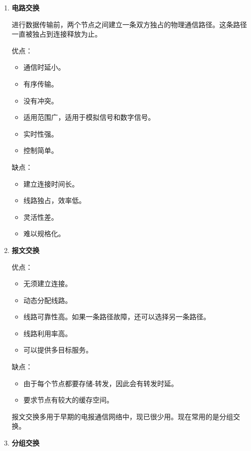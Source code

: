 \documentclass[12pt, a4paper, oneside]{ctexart}
\begin{document}
\begin{enumerate}
    \item {\bf 电路交换}
    
    进行数据传输前，两个节点之间建立一条双方独占的物理通信路径。这条路径一直被独占到连接释放为止。

    优点：
    \begin{itemize}
        \item 通信时延小。
        \item 有序传输。
        \item 没有冲突。
        \item 适用范围广，适用于模拟信号和数字信号。
        \item 实时性强。
        \item 控制简单。
    \end{itemize}
    缺点：
    \begin{itemize}
        \item 建立连接时间长。
        \item 线路独占，效率低。
        \item 灵活性差。
        \item 难以规格化。
    \end{itemize}
    \item {\bf 报文交换}
    
    优点：
    \begin{itemize}
        \item 无须建立连接。
        \item 动态分配线路。
        \item 线路可靠性高。如果一条路径故障，还可以选择另一条路径。
        \item 线路利用率高。
        \item 可以提供多目标服务。
    \end{itemize}
    缺点：
    \begin{itemize}
        \item 由于每个节点都要存储-转发，因此会有转发时延。
        \item 要求节点有较大的缓存空间。
    \end{itemize}
    报文交换多用于早期的电报通信网络中，现已很少用。现在常用的是分组交换。
    \item {\bf 分组交换}
    

\end{enumerate}
\end{document}
